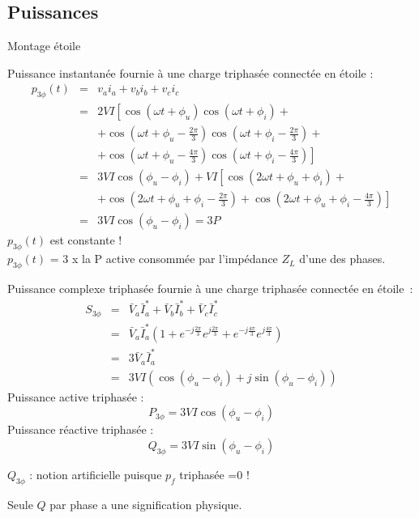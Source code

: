 \subsection{Puissances}
\begin{frame}[allowframebreaks]{Montage étoile}
	
	Puissance instantanée fournie à une charge triphasée connectée en
	étoile :
	{\small \begin{eqnarray*}
			p_{3\phi}(t)& =& v_ai_a+v_bi_b+v_ci_c\\
			& = & 2VI\left[\cos(\omega t+\phi_u)\cos(\omega t+\phi_i)+ \right.\\
			& & \left. + \cos(\omega
			t+\phi_u-\frac{2\pi}{3})\cos(\omega t+\phi_i-\frac{2\pi}{3})+ \right.\\
			& & \left. +\cos(\omega t+\phi_u-\frac{4\pi}{3})\cos(\omega
			t+\phi_i-\frac{4\pi}{3})\right]\\
			& = &3VI\cos(\phi_u-\phi_i)+ VI\left[
			\cos(2\omega t+\phi_u+\phi_i)+ \right.\\
			& & \left. + \cos(2\omega t+\phi_u+\phi_i-\frac{2\pi}{3})+
			\cos(2\omega t+\phi_u+\phi_i-\frac{4\pi}{3})\right]\\
			& = & 3VI\cos(\phi_u-\phi_i)=3P
		\end{eqnarray*}}
		$p_{3\phi}(t)$ est constante !\\
		$p_{3\phi}(t)$ = 3 x la P active consommée par l'impédance $Z_L$  d'une des phases.

	Puissance complexe triphasée fournie à une charge triphasée connectée en
	étoile~:
	{\small \begin{eqnarray*}
			S_{3\phi}& = &\bar{V}_a\bar{I}_a^*+\bar{V}_b\bar{I}_b^*+\bar{V}_c\bar{I}_c^*\\
			& = & \bar{V}_a\bar{I}_a^*(1+e^{-j\frac{2\pi}{3}}e^{j\frac{2\pi}{3}}+
			e^{-j\frac{4\pi}{3}}e^{j\frac{4\pi}{3}})\\
			& =& 3\bar{V}_a\bar{I}_a^*\\
			& = & 3VI(\cos(\phi_u-\phi_i)+j\sin(\phi_u-\phi_i))
		\end{eqnarray*}}
		Puissance active triphasée :
		\[P_{3\phi}=3VI\cos(\phi_u-\phi_i)\]
		Puissance réactive triphasée :
		\[Q_{3\phi}=3VI\sin(\phi_u-\phi_i)\]
		
		$Q_{3\phi}$ : notion artificielle puisque $p_f$ triphasée =0 !
		
		Seule $Q$ par phase a une signification physique.
\end{frame}
		
		
